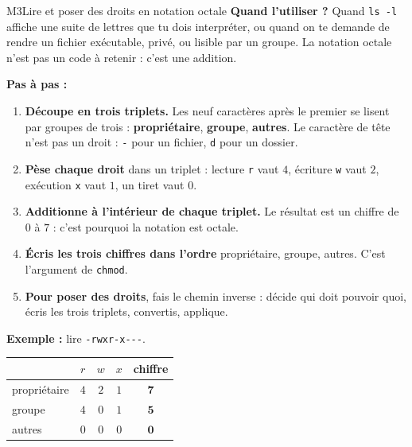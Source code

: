 \begin{fichemethode}{M3}{Lire et poser des droits en notation octale}
\textbf{Quand l'utiliser ?} Quand \lstinline{ls -l} affiche une suite de lettres que tu dois
interpréter, ou quand on te demande de rendre un fichier exécutable, privé, ou lisible par
un groupe. La notation octale n'est pas un code à retenir : c'est une addition.

\textbf{Pas à pas :}
\begin{enumerate}
  \item \textbf{Découpe en trois triplets.} Les neuf caractères après le premier se lisent
    par groupes de trois : \textbf{propriétaire}, \textbf{groupe}, \textbf{autres}. Le
    caractère de tête n'est pas un droit : \lstinline{-} pour un fichier, \lstinline{d} pour
    un dossier.
  \item \textbf{Pèse chaque droit} dans un triplet : lecture \lstinline{r} vaut $4$,
    écriture \lstinline{w} vaut $2$, exécution \lstinline{x} vaut $1$, un tiret vaut $0$.
  \item \textbf{Additionne à l'intérieur de chaque triplet.} Le résultat est un chiffre de
    $0$ à $7$ : c'est pourquoi la notation est octale.
  \item \textbf{Écris les trois chiffres dans l'ordre} propriétaire, groupe, autres. C'est
    l'argument de \lstinline{chmod}.
  \item \textbf{Pour poser des droits}, fais le chemin inverse : décide qui doit pouvoir
    quoi, écris les trois triplets, convertis, applique.
\end{enumerate}

\textbf{Exemple :} lire \lstinline{-rwxr-x---}.

\begin{center}
\begin{tabular}{l|ccc|c}
& $r$ & $w$ & $x$ & chiffre \\
\hline
propriétaire & $4$ & $2$ & $1$ & $\mathbf{7}$ \\
groupe & $4$ & $0$ & $1$ & $\mathbf{5}$ \\
autres & $0$ & $0$ & $0$ & $\mathbf{0}$ \\
\end{tabular}
\end{center}


\end{fichemethode}
